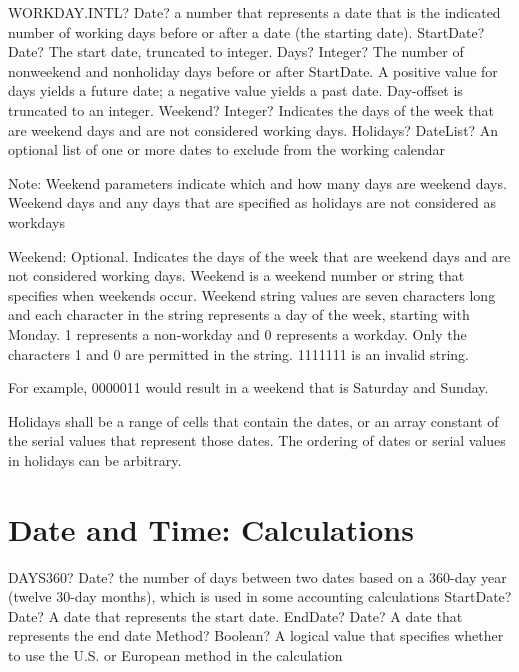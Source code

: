 \begin{mpFunctionsExtract}
	\mpWorksheetFunctionFourNotImplemented
	{WORKDAY.INTL? Date? a number that represents a date that is the indicated number of working days before or after a date (the starting date).}
	{StartDate? Date? The start date, truncated to integer.}
	{Days? Integer? The number of nonweekend and nonholiday days before or after StartDate. A positive value for days yields a future date; a negative value yields a past date.  Day-offset is truncated to an integer.}
	{Weekend? Integer? Indicates the days of the week that are weekend days and are not considered working days.}
	{Holidays? DateList?  An optional list of one or more dates to exclude from the working calendar}
\end{mpFunctionsExtract}

\vspace{0.3cm}
Note: Weekend parameters indicate which and how many days are weekend days. Weekend days and any days that are specified as holidays are not considered as workdays

Weekend:  Optional. Indicates the days of the week that are weekend days and are not considered working days. Weekend is a weekend number or string that specifies when weekends occur.
Weekend string values are seven characters long and each character in the string represents a day of the week, starting with Monday. 1 represents a non-workday and 0 represents a workday. Only the characters 1 and 0 are permitted in the string. 1111111 is an invalid string.

For example, 0000011 would result in a weekend that is Saturday and Sunday.

Holidays shall be a range of cells that contain the dates, or an array constant of the serial values that represent those dates. The ordering of dates or serial values in holidays can be arbitrary.





\newpage
\section{Date and Time: Calculations}

\begin{mpFunctionsExtract}
	\mpWorksheetFunctionThreeNotImplemented
	{DAYS360? Date? the number of days between two dates based on a 360-day year (twelve 30-day months), which is used in some accounting calculations}
	{StartDate? Date? A date that represents the start date.}
	{EndDate? Date? A date that represents the end date}
	{Method? Boolean?  A logical value that specifies whether to use the U.S. or European method in the calculation}
\end{mpFunctionsExtract}

